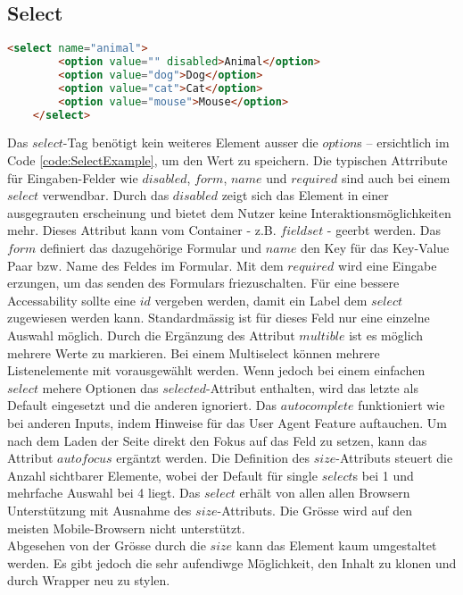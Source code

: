 \subsection{Select}

\begin{lstlisting}[language = html, caption = Select Example, label = code:SelectExample]
    <select name="animal">
        <option value="" disabled>Animal</option>
        <option value="dog">Dog</option>
        <option value="cat">Cat</option>
        <option value="mouse">Mouse</option>
    </select>
\end{lstlisting}

Das $select$-Tag benötigt kein weiteres Element ausser die $option$s – ersichtlich im Code \ref{code:SelectExample}, um den Wert zu speichern.
Die typischen Attrribute für Eingaben-Felder wie $disabled$, $form$, $name$ und $required$ sind auch bei einem $select$ verwendbar.
Durch das $disabled$ zeigt sich das Element in einer ausgegrauten erscheinung und bietet dem Nutzer keine Interaktionsmöglichkeiten mehr.
Dieses Attribut kann vom Container - z.B. $fieldset$ - geerbt werden.
Das $form$ definiert das dazugehörige Formular und $name$ den Key für das Key-Value Paar bzw. Name des Feldes im Formular. 
Mit dem $required$ wird eine Eingabe erzungen, um das senden des Formulars friezuschalten.
Für eine bessere Accessability sollte eine $id$ vergeben werden, damit ein Label dem $select$ zugewiesen werden kann.
Standardmässig ist für dieses Feld nur eine einzelne Auswahl möglich.
Durch die Ergänzung des Attribut $multible$ ist es möglich mehrere Werte zu markieren.
Bei einem Multiselect können mehrere Listenelemente mit vorausgewählt werden.
Wenn jedoch bei einem einfachen $select$ mehere Optionen das $selected$-Attribut enthalten, wird das letzte als Default eingesetzt und die anderen ignoriert.
Das $autocomplete$ funktioniert wie bei anderen Inputs, indem Hinweise für das User Agent Feature auftauchen.
Um nach dem Laden der Seite direkt den Fokus auf das Feld zu setzen, kann das Attribut $autofocus$ ergäntzt werden.
Die Definition des $size$-Attributs steuert die Anzahl sichtbarer Elemente, wobei der Default für single $select$s bei 1 und mehrfache Auswahl bei 4 liegt.
Das $select$ erhält von allen allen Browsern Unterstützung mit Ausnahme des $size$-Attributs.
Die Grösse wird auf den meisten Mobile-Browsern nicht unterstützt.
\\ 
Abgesehen von der Grösse durch die $size$ kann das Element kaum umgestaltet werden.
Es gibt jedoch die sehr aufendiwge Möglichkeit, den Inhalt zu klonen und durch Wrapper neu zu stylen.
